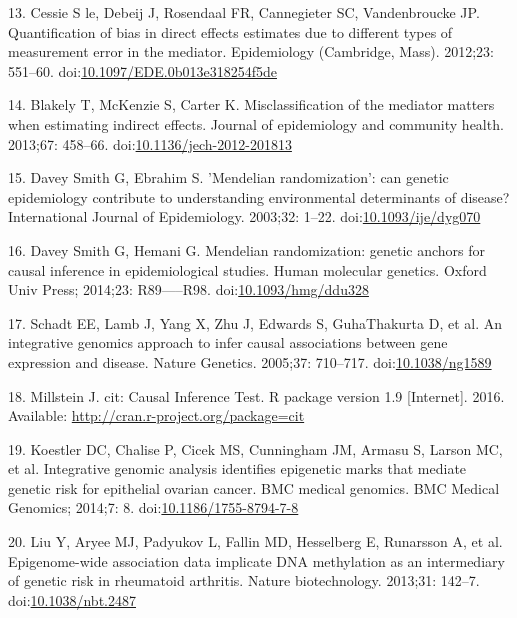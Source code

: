 \documentclass[]{article}
\begin{document}
\hypertarget{ref-LeCessie2012}{}
13. Cessie S le, Debeij J, Rosendaal FR, Cannegieter SC, Vandenbroucke
JP. Quantification of bias in direct effects estimates due to different
types of measurement error in the mediator. Epidemiology (Cambridge,
Mass). 2012;23: 551--60.
doi:\href{https://doi.org/10.1097/EDE.0b013e318254f5de}{10.1097/EDE.0b013e318254f5de}

\hypertarget{ref-Blakely2013}{}
14. Blakely T, McKenzie S, Carter K. Misclassification of the mediator
matters when estimating indirect effects. Journal of epidemiology and
community health. 2013;67: 458--66.
doi:\href{https://doi.org/10.1136/jech-2012-201813}{10.1136/jech-2012-201813}

\hypertarget{ref-DaveySmith2003}{}
15. Davey Smith G, Ebrahim S. 'Mendelian randomization': can genetic
epidemiology contribute to understanding environmental determinants of
disease? International Journal of Epidemiology. 2003;32: 1--22.
doi:\href{https://doi.org/10.1093/ije/dyg070}{10.1093/ije/dyg070}

\hypertarget{ref-DaveySmithHemani2014}{}
16. Davey Smith G, Hemani G. Mendelian randomization: genetic anchors
for causal inference in epidemiological studies. Human molecular
genetics. Oxford Univ Press; 2014;23: R89-----R98.
doi:\href{https://doi.org/10.1093/hmg/ddu328}{10.1093/hmg/ddu328}

\hypertarget{ref-Schadt2005}{}
17. Schadt EE, Lamb J, Yang X, Zhu J, Edwards S, GuhaThakurta D, et al.
An integrative genomics approach to infer causal associations between
gene expression and disease. Nature Genetics. 2005;37: 710--717.
doi:\href{https://doi.org/10.1038/ng1589}{10.1038/ng1589}

\hypertarget{ref-Millstein2016}{}
18. Millstein J. cit: Causal Inference Test. R package version 1.9
{[}Internet{]}. 2016. Available:
\url{http://cran.r-project.org/package=cit}

\hypertarget{ref-Koestler2014}{}
19. Koestler DC, Chalise P, Cicek MS, Cunningham JM, Armasu S, Larson
MC, et al. Integrative genomic analysis identifies epigenetic marks that
mediate genetic risk for epithelial ovarian cancer. BMC medical
genomics. BMC Medical Genomics; 2014;7: 8.
doi:\href{https://doi.org/10.1186/1755-8794-7-8}{10.1186/1755-8794-7-8}

\hypertarget{ref-Liu2013}{}
20. Liu Y, Aryee MJ, Padyukov L, Fallin MD, Hesselberg E, Runarsson A,
et al. Epigenome-wide association data implicate DNA methylation as an
intermediary of genetic risk in rheumatoid arthritis. Nature
biotechnology. 2013;31: 142--7.
doi:\href{https://doi.org/10.1038/nbt.2487}{10.1038/nbt.2487}
\end{document}
